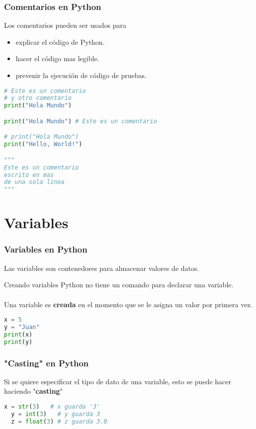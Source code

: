 \begin{frame}[fragile]
  \frametitle{Comentarios en Python}

  Los comentarios pueden ser usados para

  \begin{itemize}
    \item explicar el código de Python.
    \item hacer el código mas legible.
    \item prevenir la ejecución de código de pruebas.
  \end{itemize}

  \begin{lstlisting}[language=Python]
# Este es un comentario
# y otro comentario
print("Hola Mundo")

print("Hola Mundo") # Este es un comentario

# print("Hola Mundo")
print("Hello, World!")

"""
Este es un comentario
escrito en mas
de una sola linea
"""
  \end{lstlisting}
\end{frame}

\section{Variables}

\begin{frame}[fragile]
  \frametitle{Variables en Python}

  Las variables son contenedores para almacenar valores de datos.

  \begin{block}{Creando variables}
    Python no tiene un comando para declarar una variable. \\~\\
    Una variable es \textbf{creada} en el momento que se le asigna un
    valor por primera vez.
  \end{block}

  \begin{lstlisting}[language=Python]
x = 5
y = "Juan"
print(x)
print(y)
  \end{lstlisting}
\end{frame}

\begin{frame}[fragile]
  \frametitle{"Casting" en Python}

  Si se quiere especificar el tipo de dato de una variable, esto se puede hacer
  haciendo "\textbf{casting}"

  \begin{lstlisting}[language=Python]
  x = str(3)   # x guarda '3'
  y = int(3)   # y guarda 3
  z = float(3) # z guarda 3.0
  \end{lstlisting}
\end{frame}

